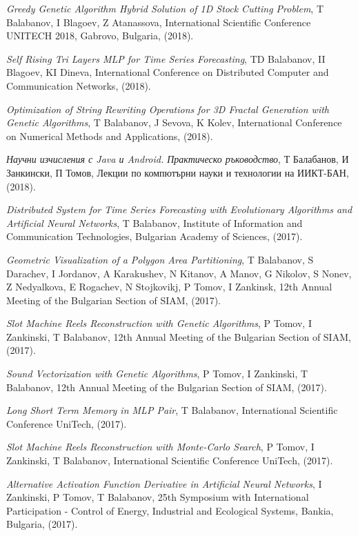 \documentclass[bulgarian,a4paper]{europasscv}
\begin{document}
\begin{europasscv}
{\begin{ecvitemize}
    \item \textit{Greedy Genetic Algorithm Hybrid Solution of 1D Stock Cutting Problem}, T Balabanov, I Blagoev, Z Atanassova, International Scientific Conference UNITECH 2018, Gabrovo, Bulgaria, (2018).
    \item \textit{Self Rising Tri Layers MLP for Time Series Forecasting}, TD Balabanov, II Blagoev, KI Dineva, International Conference on Distributed Computer and Communication Networks, (2018).
    \item \textit{Optimization of String Rewriting Operations for 3D Fractal Generation with Genetic Algorithms}, T Balabanov, J Sevova, K Kolev, International Conference on Numerical Methods and Applications, (2018).
    \item \textit{Научни изчисления с Java и Android. Практическо ръководство}, Т Балабанов, И Занкински, П Томов, Лекции по компютърни науки и технологии на ИИКТ-БАН, (2018).
    \item \textit{Distributed System for Time Series Forecasting with Evolutionary Algorithms and Artificial Neural Networks}, T Balabanov, Institute of Information and Communication Technologies, Bulgarian Academy of Sciences, (2017).
    \item \textit{Geometric Visualization of a Polygon Area Partitioning}, T Balabanov, S Darachev, I Jordanov, A Karakushev, N Kitanov, A Manov, G Nikolov, S Nonev, Z Nedyalkova, E Rogachev, N Stojkovikj, P Tomov, I Zankinsk, 12th Annual Meeting of the Bulgarian Section of SIAM, (2017).
    \item \textit{Slot Machine Reels Reconstruction with Genetic Algorithms}, P Tomov, I Zankinski, T Balabanov, 12th Annual Meeting of the Bulgarian Section of SIAM, (2017).
    \item \textit{Sound Vectorization with Genetic Algorithms}, P Tomov, I Zankinski, T Balabanov, 12th Annual Meeting of the Bulgarian Section of SIAM, (2017).
    \item \textit{Long Short Term Memory in MLP Pair}, T Balabanov, International Scientific Conference UniTech, (2017).
    \item \textit{Slot Machine Reels Reconstruction with Monte-Carlo Search}, P Tomov, I Zankinski, T Balabanov, International Scientific Conference UniTech, (2017).
    \item \textit{Alternative Activation Function Derivative in Artificial Neural Networks}, I Zankinski, P Tomov, T Balabanov, 25th Symposium with International Participation - Control of Energy, Industrial and Ecological Systems, Bankia, Bulgaria, (2017).

\end{ecvitemize}}
\end{europasscv}
\end{document}
